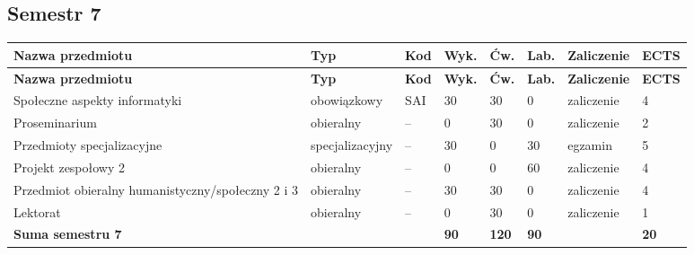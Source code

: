 \documentclass[12pt,a4paper]{article}
\newcommand{\thdrule}{\noalign{\global\setlength{\extrarowheight}{0pt}}}
\newcommand{\thdend}{\noalign{\global\setlength{\extrarowheight}{4pt}}}
\begin{document}
\clearpage
\subsection*{Semestr 7}

{\scriptsize
\begin{longtable}{m{5.0cm}m{1.9cm}m{0.75cm}m{0.85cm}m{0.85cm}m{0.85cm}m{1.45cm}m{0.9cm}}
\thdrule\toprule
\rowcolor{pjatkRed}
{\color{white}\footnotesize\textbf{\vphantom{Ag}Nazwa przedmiotu}} & {\color{white}\footnotesize\textbf{\vphantom{Ag}Typ}} & {\color{white}\footnotesize\textbf{\vphantom{Ag}Kod}} & {\color{white}\footnotesize\textbf{\vphantom{Ag}Wyk.}} & {\color{white}\footnotesize\textbf{\vphantom{Ag}Ćw.}} & {\color{white}\footnotesize\textbf{\vphantom{Ag}Lab.}} & {\color{white}\footnotesize\textbf{\vphantom{Ag}Zaliczenie}} & {\color{white}\footnotesize\textbf{\vphantom{Ag}ECTS}} \\
\midrule\thdend
\endfirsthead
\thdrule\toprule
\rowcolor{pjatkRed}
{\color{white}\footnotesize\textbf{\vphantom{Ag}Nazwa przedmiotu}} & {\color{white}\footnotesize\textbf{\vphantom{Ag}Typ}} & {\color{white}\footnotesize\textbf{\vphantom{Ag}Kod}} & {\color{white}\footnotesize\textbf{\vphantom{Ag}Wyk.}} & {\color{white}\footnotesize\textbf{\vphantom{Ag}Ćw.}} & {\color{white}\footnotesize\textbf{\vphantom{Ag}Lab.}} & {\color{white}\footnotesize\textbf{\vphantom{Ag}Zaliczenie}} & {\color{white}\footnotesize\textbf{\vphantom{Ag}ECTS}} \\
\midrule\thdend
\endhead
\rowcolor{tableRowLight} Społeczne aspekty informatyki & {\scriptsize obowiązkowy} & SAI & 30 & 30 & 0 & {\scriptsize zaliczenie} & 4 \\
\rowcolor{tableElective} Proseminarium & {\scriptsize obieralny} & -- & 0 & 30 & 0 & {\scriptsize zaliczenie} & 2 \\
\rowcolor{tableElective} Przedmioty specjalizacyjne & {\scriptsize specjalizacyjny} & -- & 30 & 0 & 30 & {\scriptsize egzamin} & 5 \\
\rowcolor{tableElective} Projekt zespołowy 2 & {\scriptsize obieralny} & -- & 0 & 0 & 60 & {\scriptsize zaliczenie} & 4 \\
\rowcolor{tableElective} Przedmiot obieralny humanistyczny/społeczny 2 i 3 & {\scriptsize obieralny} & -- & 30 & 30 & 0 & {\scriptsize zaliczenie} & 4 \\
\rowcolor{tableElective} Lektorat & {\scriptsize obieralny} & -- & 0 & 30 & 0 & {\scriptsize zaliczenie} & 1 \\
\midrule[\heavyrulewidth]
\rowcolor{tableSummary} \textbf{Suma semestru 7} & & & \textbf{90} & \textbf{120} & \textbf{90} & & \textbf{20} \\
\bottomrule
\end{longtable}}
\end{document}
